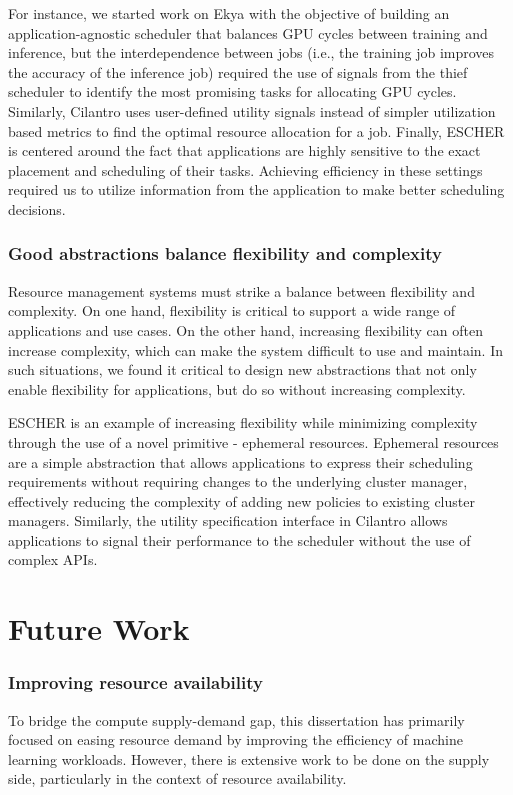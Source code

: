 For instance, we started work on Ekya with the objective of building an application-agnostic scheduler that balances GPU cycles between training and inference, but the interdependence between jobs (i.e., the training job improves the accuracy of the inference job) required the use of signals from the thief scheduler to identify the most promising tasks for allocating GPU cycles. Similarly, Cilantro uses user-defined utility signals instead of simpler utilization based metrics to find the optimal resource allocation for a job. Finally, ESCHER is centered around the fact that applications are highly sensitive to the exact placement and scheduling of their tasks. Achieving efficiency in these settings required us to utilize information from the application to make better scheduling decisions.

\subsubsection{Good abstractions balance flexibility and complexity}
Resource management systems must strike a balance between flexibility and complexity. On one hand, flexibility is critical to support a wide range of applications and use cases. On the other hand, increasing flexibility can often increase complexity, which can make the system difficult to use and maintain. In such situations, we found it critical to design new abstractions that not only enable flexibility for applications, but do so without increasing complexity. 

ESCHER is an example of increasing flexibility while minimizing complexity through the use of a novel primitive - ephemeral resources. Ephemeral resources are a simple abstraction that allows applications to express their scheduling requirements without requiring changes to the underlying cluster manager, effectively reducing the complexity of adding new policies to existing cluster managers. Similarly, the utility specification interface in Cilantro allows applications to signal their performance to the scheduler without the use of complex APIs. 

\section{Future Work}

\subsubsection{Improving resource availability}
To bridge the compute supply-demand gap, this dissertation has primarily focused on easing resource demand by improving the efficiency of machine learning workloads. However, there is extensive work to be done on the supply side, particularly in the context of resource availability.

